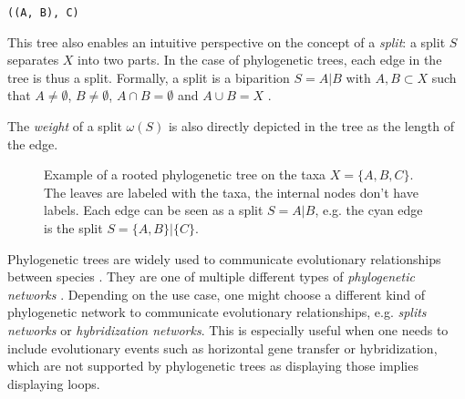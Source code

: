 \texttt{((A, B), C)}

This tree also enables an intuitive perspective on the concept of a
\textit{split}: a split $S$ separates $X$ into two parts. In the case of
phylogenetic trees, each edge in the tree is thus a split. Formally, a split is
a biparition $S=A|B$ with $A, B \subset X$ such that $A \neq \emptyset$, $B \neq
\emptyset$, $A \cap B = \emptyset$ and $A \cup B = X$
\cite{scornavaccaSplitsUnrootedPhylogenetic2010}.

The \textit{weight} of a split $\omega(S)$ is also directly depicted in the tree
as the length of the edge. 

\begin{figure}
  \centering
  \caption[Example of a rooted phylogenetic tree]{Example of a rooted
  phylogenetic tree on the taxa $X = \{A, B, C\}$. The leaves are labeled with
  the taxa, the internal nodes don't have labels. Each edge can be seen as a
  split $S=A|B$, e.g. the cyan edge is the split $S = \{A, B\} | \{C\}$.}
  \label{fig:exampleTree}
\end{figure}

Phylogenetic trees are widely used to communicate evolutionary relationships
between species
\cite{mandalComparativeGenomeAnalysis2022,winkworthComparativeAnalysesComplete2022,ayala-usmaWholeGenomeDuplication2021}.
They are one of multiple different types of \textit{phylogenetic networks}
\cite{husonApplicationPhylogeneticNetworks2006}. Depending on the use case, one
might choose a different kind of phylogenetic network to communicate
evolutionary relationships, e.g. \textit{splits networks} or
\textit{hybridization networks}. This is especially useful when one needs to
include evolutionary events such as horizontal gene transfer or hybridization,
which are not supported by phylogenetic trees as displaying those implies
displaying loops. 

